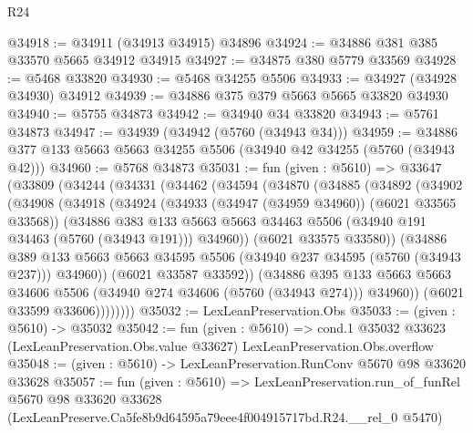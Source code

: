 \begin{lexlean}{R24}
\begin{coremodule}
@34918 := @34911 (@34913 @34915) @34896
@34924 := @34886 @381 @385 @33570 @5665 @34912 @34915
@34927 := @34875 @380 @5779 @33569
@34928 := @5468 @33820
@34930 := @5468 @34255 @5506
@34933 := @34927 (@34928 @34930) @34912
@34939 := @34886 @375 @379 @5663 @5665 @33820 @34930
@34940 := @5755 @34873
@34942 := @34940 @34 @33820
@34943 := @5761 @34873
@34947 := @34939 (@34942 (@5760 (@34943 @34)))
@34959 := @34886 @377 @133 @5663 @5663 @34255 @5506 (@34940 @42 @34255 (@5760 (@34943 @42)))
@34960 := @5768 @34873
@35031 := fun (given : @5610) =>
  @33647
    (@33809
      (@34244
        (@34331
          (@34462
            (@34594
              (@34870
                (@34885
                  (@34892
                    (@34902
                      (@34908
                        (@34918
                          (@34924
                            (@34933 (@34947 (@34959 @34960)) (@6021 @33565 @33568))
                            (@34886
                              @383
                              @133
                              @5663
                              @5663
                              @34463
                              @5506
                              (@34940 @191 @34463 (@5760 (@34943 @191)))
                              @34960))
                          (@6021 @33575 @33580))
                        (@34886
                          @389
                          @133
                          @5663
                          @5663
                          @34595
                          @5506
                          (@34940 @237 @34595 (@5760 (@34943 @237)))
                          @34960))
                      (@6021 @33587 @33592))
                    (@34886
                      @395
                      @133
                      @5663
                      @5663
                      @34606
                      @5506
                      (@34940 @274 @34606 (@5760 (@34943 @274)))
                      @34960))
                  (@6021 @33599 @33606))))))))
@35032 := LexLeanPreservation.Obs
@35033 := (given : @5610) -> @35032
@35042 := fun (given : @5610) =>
  cond.{1} @35032 @33623 (LexLeanPreservation.Obs.value @33627) LexLeanPreservation.Obs.overflow
@35048 := (given : @5610) -> LexLeanPreservation.RunConv @5670 @98 @33620 @33628
@35057 := fun (given : @5610) =>
  LexLeanPreservation.run_of_funRel
    @5670
    @98
    @33620
    @33628
    (LexLeanPreserve.Ca5fe8b9d64595a79eee4f004915717bd.R24.__rel_0 @5470)
\end{coremodule}
\end{lexlean}
